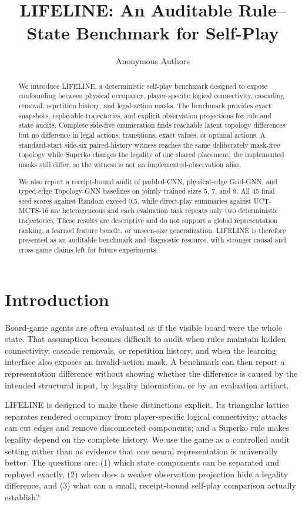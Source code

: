 \documentclass[10pt,letterpaper]{article}
\title{LIFELINE: An Auditable Rule--State Benchmark for Self-Play}
\author{Anonymous Authors}
\date{}
\begin{document}
\maketitle

\begin{abstract}
We introduce LIFELINE, a deterministic self-play benchmark designed to expose
confounding between physical occupancy, player-specific logical connectivity,
cascading removal, repetition history, and legal-action masks. The benchmark
provides exact snapshots, replayable trajectories, and explicit observation
projections for rule and state audits. Complete side-five enumeration finds
reachable latent topology differences but no difference in legal actions,
transitions, exact values, or optimal actions. A standard-start side-six
paired-history witness reaches the same deliberately mask-free topology while
Superko changes the legality of one shared placement; the implemented masks
still differ, so the witness is not an implemented-observation alias.

We also report a receipt-bound audit of padded-CNN, physical-edge Grid-GNN, and
typed-edge Topology-GNN baselines on jointly trained sizes 5, 7, and 9. All
45 final seed scores against Random exceed 0.5, while direct-play summaries
against UCT-MCTS-16 are heterogeneous and each evaluation task repeats only
two deterministic trajectories. These results are descriptive and do not
support a global representation ranking, a learned feature benefit, or
unseen-size generalization. LIFELINE is therefore presented as an auditable
benchmark and diagnostic resource, with stronger causal and cross-game claims
left for future experiments.
\end{abstract}

\section{Introduction}
\label{sec:introduction}

Board-game agents are often evaluated as if the visible board were the whole
state. That assumption becomes difficult to audit when rules maintain hidden
connectivity, cascade removals, or repetition history, and when the learning
interface also exposes an invalid-action mask. A benchmark can then report a
representation difference without showing whether the difference is caused by
the intended structural input, by legality information, or by an evaluation
artifact.

LIFELINE is designed to make these distinctions explicit. Its triangular
lattice separates rendered occupancy from player-specific logical
connectivity; attacks can cut edges and remove disconnected components; and a
Superko rule makes legality depend on the complete history. We use the game as
a controlled audit setting rather than as evidence that one neural
representation is universally better. The questions are: (1) which state
components can be separated and replayed exactly, (2) when does a weaker
observation projection hide a legality difference, and (3) what can a small,
receipt-bound self-play comparison actually establish?
\end{document}
